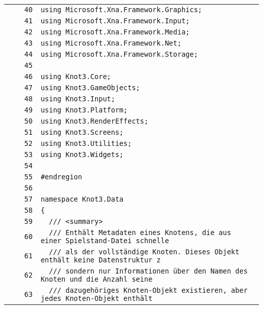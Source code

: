 \documentclass[a4paper,10pt]{article}
\begin{document}
\begin{longtable}[l]{lrrl}
\cellcolor{gray} &  & \verb~40~ & \verb~using Microsoft.Xna.Framework.Graphics;~\\
\cellcolor{gray} &  & \verb~41~ & \verb~using Microsoft.Xna.Framework.Input;~\\
\cellcolor{gray} &  & \verb~42~ & \verb~using Microsoft.Xna.Framework.Media;~\\
\cellcolor{gray} &  & \verb~43~ & \verb~using Microsoft.Xna.Framework.Net;~\\
\cellcolor{gray} &  & \verb~44~ & \verb~using Microsoft.Xna.Framework.Storage;~\\
\cellcolor{gray} &  & \verb~45~ & \verb~~\\
\cellcolor{gray} &  & \verb~46~ & \verb~using Knot3.Core;~\\
\cellcolor{gray} &  & \verb~47~ & \verb~using Knot3.GameObjects;~\\
\cellcolor{gray} &  & \verb~48~ & \verb~using Knot3.Input;~\\
\cellcolor{gray} &  & \verb~49~ & \verb~using Knot3.Platform;~\\
\cellcolor{gray} &  & \verb~50~ & \verb~using Knot3.RenderEffects;~\\
\cellcolor{gray} &  & \verb~51~ & \verb~using Knot3.Screens;~\\
\cellcolor{gray} &  & \verb~52~ & \verb~using Knot3.Utilities;~\\
\cellcolor{gray} &  & \verb~53~ & \verb~using Knot3.Widgets;~\\
\cellcolor{gray} &  & \verb~54~ & \verb~~\\
\cellcolor{gray} &  & \verb~55~ & \verb~#endregion~\\
\cellcolor{gray} &  & \verb~56~ & \verb~~\\
\cellcolor{gray} &  & \verb~57~ & \verb~namespace Knot3.Data~\\
\cellcolor{gray} &  & \verb~58~ & \verb~{~\\
\cellcolor{gray} &  & \verb~59~ & \verb~  /// <summary>~\\
\cellcolor{gray} &  & \verb~60~ & \verb~  /// Enthält Metadaten eines Knotens, die aus einer Spielstand-Datei schnelle~\\
\cellcolor{gray} &  & \verb~61~ & \verb~  /// als der vollständige Knoten. Dieses Objekt enthält keine Datenstruktur z~\\
\cellcolor{gray} &  & \verb~62~ & \verb~  /// sondern nur Informationen über den Namen des Knoten und die Anzahl seine~\\
\cellcolor{gray} &  & \verb~63~ & \verb~  /// dazugehöriges Knoten-Objekt existieren, aber jedes Knoten-Objekt enthält~\\

\end{longtable}
\end{document}
